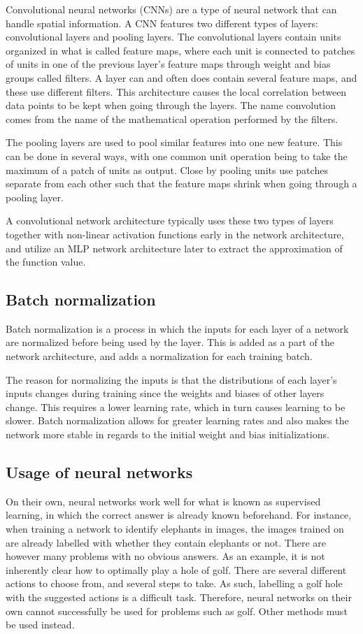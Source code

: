 \documentclass{kththesis}
\begin{document}
Convolutional neural networks (CNNs) are a type of neural network that can handle spatial information. A CNN features two different types of layers: convolutional layers and pooling layers. The convolutional layers contain units organized in what is called feature maps, where each unit is connected to patches of units in one of the previous layer's feature maps through weight and bias groups called filters. A layer can and often does contain several feature maps, and these use different filters. This architecture causes the local correlation between data points to be kept when going through the layers. The name convolution comes from the name of the mathematical operation performed by the filters. \parencite{lecun2015deep}

The pooling layers are used to pool similar features into one new feature. This can be done in several ways, with one common unit operation being to take the maximum of a patch of units as output. Close by pooling units use patches separate from each other such that the feature maps shrink when going through a pooling layer. \parencite{lecun2015deep}

A convolutional network architecture typically uses these two types of layers together with non-linear activation functions early in the network architecture, and utilize an MLP network architecture later to extract the approximation of the function value. \parencite{lecun2015deep}

\subsection{Batch normalization}
Batch normalization is a process in which the inputs for each layer of a network are normalized before being used by the layer. This is added as a part of the network architecture, and adds a normalization for each training batch.

The reason for normalizing the inputs is that the distributions of each layer's inputs changes during training since the weights and biases of other layers change. This requires a lower learning rate, which in turn causes learning to be slower. Batch normalization allows for greater learning rates and also makes the network more stable in regards to the initial weight and bias initializations. \parencite{ioffe2015batch}

\subsection{Usage of neural networks}
On their own, neural networks work well for what is known as supervised learning, in which the correct answer is already known beforehand. For instance, when training a network to identify elephants in images, the images trained on are already labelled with whether they contain elephants or not. There are however many problems with no obvious answers. As an example, it is not inherently clear how to optimally play a hole of golf. There are several different actions to choose from, and several steps to take. As such, labelling a golf hole with the suggested actions is a difficult task. Therefore, neural networks on their own cannot successfully be used for problems such as golf. Other methods must be used instead.
\end{document}
